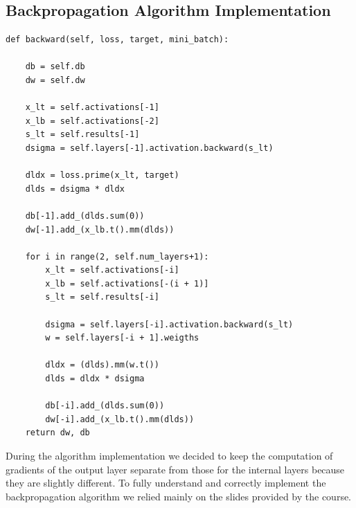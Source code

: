 \subsection{Backpropagation Algorithm Implementation}
\label{sect:Backpropagation}

\begin{verbatim}
def backward(self, loss, target, mini_batch):
    
    db = self.db
    dw = self.dw
    
    x_lt = self.activations[-1] 
    x_lb = self.activations[-2] 
    s_lt = self.results[-1]  
    dsigma = self.layers[-1].activation.backward(s_lt) 
    
    dldx = loss.prime(x_lt, target) 
    dlds = dsigma * dldx 
    
    db[-1].add_(dlds.sum(0)) 
    dw[-1].add_(x_lb.t().mm(dlds))
    
    for i in range(2, self.num_layers+1):
	    x_lt = self.activations[-i]
	    x_lb = self.activations[-(i + 1)]            
	    s_lt = self.results[-i]
	    
	    dsigma = self.layers[-i].activation.backward(s_lt)
	    w = self.layers[-i + 1].weigths
	    
	    dldx = (dlds).mm(w.t())
	    dlds = dldx * dsigma  
	    
	    db[-i].add_(dlds.sum(0))
	    dw[-i].add_(x_lb.t().mm(dlds)) 
    return dw, db
\end{verbatim}

During the algorithm implementation we decided to keep the computation of gradients of the output layer separate from those for the internal layers because they are slightly different. To fully understand and correctly implement the backpropagation algorithm we relied mainly on the slides provided by the course. 

